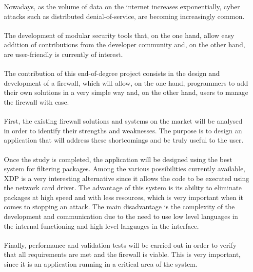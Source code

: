 Nowadays, as the volume of data on the internet increases exponentially, cyber attacks such as distributed denial-of-service, are becoming increasingly common.
\\\\The development of modular security tools that, on the one hand, allow easy addition of contributions from the developer community and, on the other hand, are user-friendly is currently of interest.
\\\\The contribution of this end-of-degree project consists in the design and development of a firewall, which will allow, on the one hand, programmers to add their own solutions in a very simple way and, on the other hand, users to manage the firewall with ease.
\\\\First, the existing firewall solutions and systems on the market will be analysed in order to identify their strengths and weaknesses. The purpose is to design an application that will address these shortcomings and be truly useful to the user.
\\\\Once the study is completed, the application will be designed using the best system for filtering packages. Among the various possibilities currently available, XDP is a very interesting alternative since it allows the code to be executed using the network card driver. The advantage of this system is its ability to eliminate packages at high speed and with less resources, which is very important when it comes to stopping an attack. The main disadvantage is the complexity of the development and communication due to the need to use low level languages in the internal functioning and high level languages in the interface.
\\\\Finally, performance and validation tests will be carried out in order to verify that all requirements are met and the firewall is viable. This is very important, since it is an application running in a critical area of the system.

